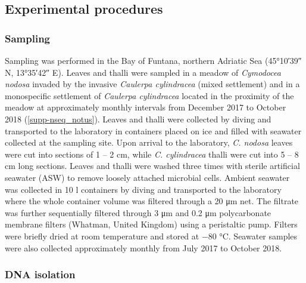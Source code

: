 \documentclass[12pt,]{article}
\begin{document}
\newpage

\hypertarget{experimental-procedures}{%
\subsection{Experimental procedures}\label{experimental-procedures}}

\hypertarget{sampling}{%
\subsubsection{Sampling}\label{sampling}}

Sampling was performed in the Bay of Funtana, northern Adriatic Sea
(\ang{45;10;39} N, \ang{13;35;42} E). Leaves and thalli were sampled in
a meadow of \emph{Cymodocea nodosa} invaded by the invasive
\emph{Caulerpa cylindracea} (mixed settlement) and in a monospecific
settlement of \emph{Caulerpa cylindracea} located in the proximity of
the meadow at approximately monthly intervals from December 2017 to
October 2018 (\autoref{supp-nseq_notus}). Leaves and thalli were
collected by diving and transported to the laboratory in containers
placed on ice and filled with seawater collected at the sampling site.
Upon arrival to the laboratory, \emph{C. nodosa} leaves were cut into
sections of 1 -- 2 \si{\cm}, while \emph{C. cylindracea} thalli were cut
into 5 -- 8 \si{\cm} long sections. Leaves and thalli were washed three
times with sterile artificial seawater (ASW) to remove loosely attached
microbial cells. Ambient seawater was collected in 10 \si{\l} containers
by diving and transported to the laboratory where the whole container
volume was filtered through a 20 \si{\um} net. The filtrate was further
sequentially filtered through 3 \si{\um} and 0.2 \si{\um} polycarbonate
membrane filters (Whatman, United Kingdom) using a peristaltic pump.
Filters were briefly dried at room temperature and stored at \num{-80}
\si{\degreeCelsius}. Seawater samples were also collected approximately
monthly from July 2017 to October 2018.

\hypertarget{dna-isolation}{%
\subsubsection{DNA isolation}\label{dna-isolation}}
\end{document}
